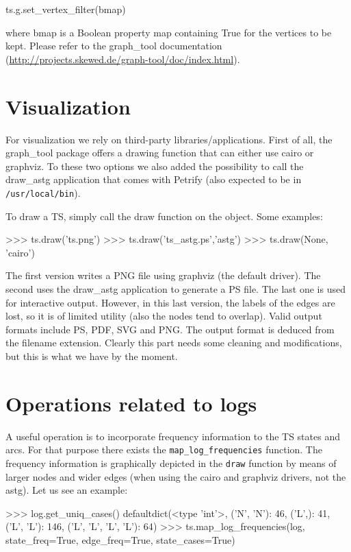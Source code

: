 \documentclass[a4paper,10pt]{book}
\begin{document}
\begin{pycode}
 ts.g.set_vertex_filter(bmap)
\end{pycode}

where bmap is a Boolean property map containing True for the vertices to be kept. Please refer to the graph\_tool documentation (\url{http://projects.skewed.de/graph-tool/doc/index.html}).

\section{Visualization}
For visualization we rely on third-party libraries/applications. First of all, the graph\_tool package offers a drawing function that can either use cairo or graphviz. To these two options we also added the possibility to call the draw\_astg application that comes with Petrify (also expected to be in \texttt{/usr/local/bin}).

To draw a TS, simply call the draw function on the object. Some examples:\\

\begin{pycode}
>>> ts.draw('ts.png')
>>> ts.draw('ts_astg.ps','astg')
>>> ts.draw(None, 'cairo')
\end{pycode}

The first version writes a PNG file using graphviz (the default driver). The second uses the draw\_astg application to generate a PS file. The last one is used for interactive output. However, in this last version, the labels of the edges are lost, so it is of limited utility (also the nodes tend to overlap). Valid output formats include PS, PDF, SVG and PNG. The output format is deduced from the filename extension. Clearly this part needs some cleaning and modifications, but this is what we have by the moment.

\section{Operations related to logs}

A useful operation is to incorporate frequency information to the TS states and arcs. For that purpose there exists the \texttt{map\_log\_frequencies} function. The frequency information is graphically depicted in the \texttt{draw} function by means of larger nodes and wider edges (when using the cairo and graphviz drivers, not the astg). Let us see an example:\\
\begin{pycode}
>>> log.get_uniq_cases()
defaultdict(<type 'int'>, {('N', 'N'): 46, ('L',): 41, 
			  ('L', 'L'): 146, ('L', 'L', 'L', 'L'): 64})
>>> ts.map_log_frequencies(log, state_freq=True, edge_freq=True, state_cases=True)
\end{pycode}
\end{document}
